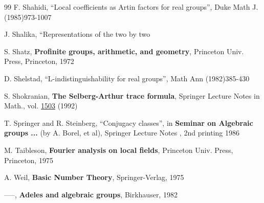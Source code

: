 \begin{thebibliography}{99}
F. Shahidi, ``Local coefficients as Artin factors
for real groups'',
Duke Math J. (1985)973-1007

 J. Shalika, ``Representations of the two by two

 S. Shatz, {\bf Profinite groups, arithmetic, and
geometry},
Princeton Univ. Press, Princeton, 1972

 D. Shelstad, ``L-indistinguishability for real groups'',
Math
Ann (1982)385-430

 S. Shokranian, {\bf The Selberg-Arthur trace formula},
Springer Lecture Notes in Math., vol. \underline{1503} (1992)


 T. Springer and R. Steinberg, ``Conjugacy classes'',
in {\bf Seminar on Algebraic groups ...} (by A. Borel, et al),
Springer Lecture Notes , 2nd printing 1986

 M. Taibleson, {\bf Fourier analysis on local fields}, 
Princeton Univ.
Press, Princeton, 1975


 A. Weil, {\bf Basic Number Theory},
Springer-Verlag, 1975

 -----, {\bf Adeles and algebraic groups}, 
Birkhauser, 1982


\end{thebibliography}


